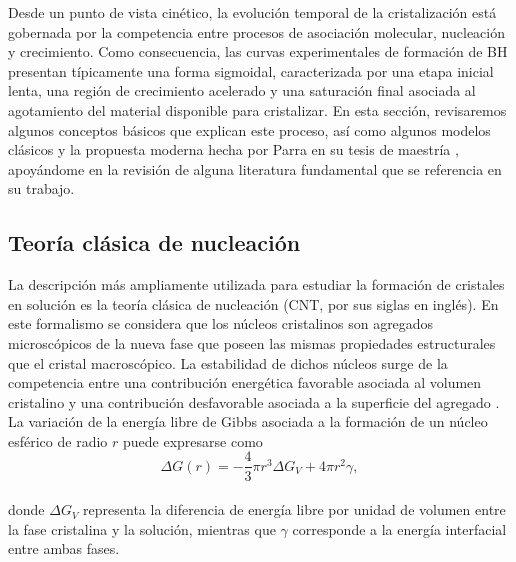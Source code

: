 \documentclass[12pt,letterpaper,oneside]{report}
\begin{document}

Desde un punto de vista cinético, la evolución temporal de la cristalización está gobernada por la competencia entre procesos de asociación molecular, nucleación y crecimiento. Como consecuencia, las curvas experimentales de formación de BH presentan típicamente una forma sigmoidal, caracterizada por una etapa inicial lenta, una región de crecimiento acelerado y una saturación final asociada al agotamiento del material disponible para cristalizar. En esta sección, revisaremos algunos conceptos básicos que explican este proceso, así como algunos modelos clásicos y la propuesta moderna hecha por Parra en su tesis de maestría \cite{AlirioParra2023}, apoyándome en la revisión de alguna literatura fundamental que se referencia en su trabajo.\\


\subsection{Teoría clásica de nucleación}

La descripción más ampliamente utilizada para estudiar la formación de cristales en solución es la teoría clásica de nucleación (CNT, por sus siglas en inglés). En este formalismo se considera que los núcleos cristalinos son agregados microscópicos de la nueva fase que poseen las mismas propiedades estructurales que el cristal macroscópico. La estabilidad de dichos núcleos surge de la competencia entre una contribución energética favorable asociada al volumen cristalino y una contribución desfavorable asociada a la superficie del agregado \cite{Erdemir2009}.\\

La variación de la energía libre de Gibbs asociada a la formación de un núcleo esférico de radio $r$ puede expresarse como\\

\begin{equation}
\Delta G(r)
=
-\frac{4}{3}\pi r^{3}\Delta G_{V}
+
4\pi r^{2}\gamma ,
\label{eq:cnt}
\end{equation}\\

\noindent donde $\Delta G_{V}$ representa la diferencia de energía libre por unidad de volumen entre la fase cristalina y la solución, mientras que $\gamma$ corresponde a la energía interfacial entre ambas fases.\\
\end{document}
